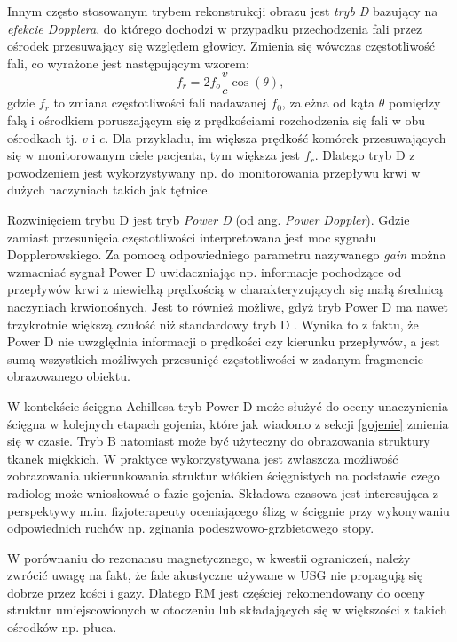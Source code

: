 Innym często stosowanym trybem rekonstrukcji obrazu jest \textit{tryb D} bazujący na \textit{efekcie Dopplera}, do którego dochodzi w przypadku przechodzenia fali przez ośrodek przesuwający się względem głowicy. Zmienia się wówczas częstotliwość fali, co wyrażone jest następującym wzorem:
\begin{equation}
f_r = 2 f_o\frac{v}{c}\cos(\theta),
\end{equation} 
gdzie $f_r$ to zmiana częstotliwości fali nadawanej $f_0$, zależna od kąta $\theta$ pomiędzy falą i ośrodkiem poruszającym się z prędkościami rozchodzenia się fali w obu ośrodkach tj. $v$ i $c$. Dla przykładu, im większa prędkość komórek przesuwających się w monitorowanym ciele pacjenta, tym większa jest $f_r$. Dlatego tryb D z powodzeniem jest wykorzystywany np. do monitorowania przepływu krwi w dużych naczyniach takich jak tętnice.

Rozwinięciem trybu D jest tryb \textit{Power D} (od ang. \textit{Power Doppler}). Gdzie zamiast przesunięcia częstotliwości interpretowana jest moc sygnału Dopplerowskiego. Za pomocą odpowiedniego parametru nazywanego \textit{gain} można wzmacniać sygnał Power D uwidaczniając np. informacje pochodzące od przepływów krwi z niewielką prędkością w charakteryzujących się małą średnicą naczyniach krwionośnych. Jest to również możliwe, gdyż tryb Power D ma nawet trzykrotnie większą czułość niż standardowy tryb D \cite{Babcock1996}. Wynika to z faktu, że Power D nie uwzględnia informacji o prędkości czy kierunku przepływów, a jest sumą wszystkich możliwych przesunięć częstotliwości w zadanym fragmencie obrazowanego obiektu.

W kontekście ścięgna Achillesa tryb Power D może służyć do oceny unaczynienia ścięgna w kolejnych etapach gojenia, które jak wiadomo z sekcji \ref{gojenie} zmienia się w czasie. Tryb B natomiast może być użyteczny do obrazowania struktury tkanek miękkich. W praktyce wykorzystywana jest zwłaszcza możliwość zobrazowania ukierunkowania struktur włókien ścięgnistych na podstawie czego radiolog może wnioskować o fazie gojenia. Składowa czasowa jest interesująca z perspektywy m.in. fizjoterapeuty oceniającego ślizg w ścięgnie przy wykonywaniu odpowiednich ruchów np. zginania podeszwowo-grzbietowego stopy. 

W porównaniu do rezonansu magnetycznego, w kwestii ograniczeń, należy zwrócić uwagę na fakt, że fale akustyczne używane w USG nie propagują się dobrze przez kości i gazy. Dlatego RM jest częściej rekomendowany do oceny struktur umiejscowionych w otoczeniu lub składających się w większości z takich ośrodków np. płuca. 

